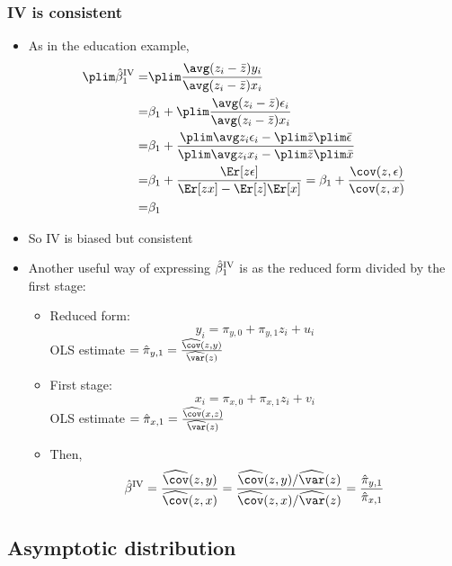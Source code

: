 \begin{frame}[allowframebreaks]\frametitle{IV is consistent}
  \begin{itemize}
  \item As in the education example,
    \begin{align*}
      \plim \biv_1 = & \plim  \frac{ \avg (z_i - \bar{z}) y_i } { \avg (z_i -
        \bar{z}) x_i }  \\
      = & \beta_1 + \plim \frac{ \avg (z_i - \bar{z}) \epsilon_i } 
      { \avg (z_i -\bar{z}) x_i } \\
      = & \beta_1 + \frac{ \plim \avg z_i \epsilon_i - \plim \bar{z}
        \plim \bar{\epsilon} } { \plim \avg z_i x_i - \plim \bar{z}
        \plim \bar{x} } \\
      = & \beta_1 + \frac{ \Er[z \epsilon]}{\Er[ z x] -
        \Er[z] \Er[x]} = \beta_1 + \frac{\cov(z,\epsilon)}{\cov(z,x)}
      \\
      = & \beta_1 
    \end{align*}
  \item So IV is biased but consistent
  \item Another useful way of expressing ${\hat{\beta}^{\mathrm{IV}}}_1$ is as the reduced
    form divided by the first stage:
    \begin{itemize}
    \item Reduced form:
      \[ y_i = \pi_{y,0} + \pi_{y,1} z_i + u_i \]  
      OLS estimate $ = \hat{\pi}_{y,1} =
      \frac{\widehat{\cov}(z,y)}{\widehat{\var}(z)}$
    \item First stage:
      \[ x_i = \pi_{x,0} + \pi_{x,1} z_i + v_i \]
      OLS estimate $ = \hat{\pi}_{x,1} =
      \frac{\widehat{\cov}(x,z)}{\widehat{\var}(z)}$
    \item Then,
      \[ \biv = \frac{\widehat{\cov}(z,y)}{\widehat{\cov}(z,x)} = 
      \frac{\widehat{\cov}(z,y)/\widehat{\var}(z)}{\widehat{\cov}(z,x)/\widehat{\var}(z)}
      =  \frac{\hat{\pi}_{y,1}}{\hat{\pi}_{x,1}} \]
    \end{itemize}
  \end{itemize}
\end{frame}

\subsection{Asymptotic distribution}

